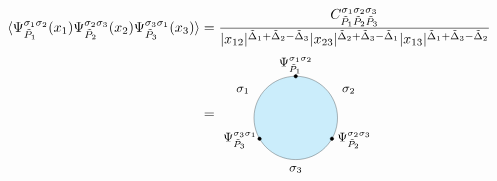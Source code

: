 \documentclass[a4paper]{article}
\begin{document}
\begin{itemize}
\begin{equation}
\begin{aligned}
\hspace{-0.2cm}\langle \Psi^{\sigma_1 \sigma_2}_{\tilde{P}_{1}}(x_1) \Psi^{\sigma_2 \sigma_3}_{\tilde{P}_{2}}(x_2) \Psi^{\sigma_3 \sigma_1}_{\tilde{P}_{3}}(x_3) \rangle&=\frac{C^{\sigma_1 \sigma_2 \sigma_3}_{\tilde{P}_1 \tilde{P}_2 \tilde{P}_3}}{|x_{12}|^{\tilde{\Delta}_1+\tilde{\Delta}_2-\tilde{\Delta}_3}|x_{23}|^{\tilde{\Delta}_2+\tilde{\Delta}_3-\tilde{\Delta}_1}|x_{13}|^{\tilde{\Delta}_1+\tilde{\Delta}_3-\tilde{\Delta}_2}}\\
&= \begin{tikzpicture}[baseline={([yshift=-.5ex]current bounding box.center)}, scale=0.7]
\draw[fill=cyan!40!white,opacity=0.5] (0,0) ellipse (1.5 and 1.5);
\draw[fill] (0,1.5) circle (0.06);
\draw[fill] (-1.3,-0.75) circle (0.06); 
\draw[fill] (1.3,-0.75) circle (0.06); 
\node at (-2,-0.8) {\small $\Psi^{\sigma_3 \sigma_1}_{\tilde{P}_{3}}$};
\node at (2.1,-0.8) {\small $\Psi^{\sigma_2 \sigma_3}_{\tilde{P}_{2}}$};
\node at (0,-1.85) {\small $\sigma_3$};
\node at (-1.9,1) {\small $\sigma_1$};
\node at (1.9,1) {\small $\sigma_2$};
\node at (0,1.9) {\small $\Psi^{\sigma_1 \sigma_2}_{\tilde{P}_{1}}$};
\end{tikzpicture}
\vspace{-0.4cm}
\end{aligned}  
\end{equation}
\end{itemize}
\end{document}
